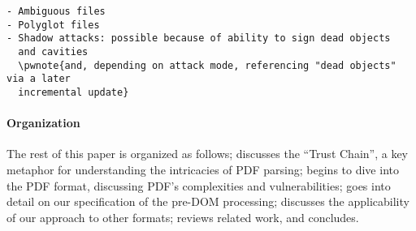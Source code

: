\label{sec:pdf-vulnerabilities}
\begin{lstlisting}[style=meta]
- Ambiguous files
- Polyglot files
- Shadow attacks: possible because of ability to sign dead objects
  and cavities 
  \pwnote{and, depending on attack mode, referencing "dead objects" via a later
  incremental update}
\end{lstlisting}

\paragraph*{Organization} The rest of this paper is organized as
follows;
%
 discusses the ``Trust Chain'', a key metaphor
for understanding the intricacies of PDF parsing;
 begins to dive into the PDF format, discussing PDF's
complexities and vulnerabilities;
 goes into detail on our specification of the pre-DOM processing;
 discusses the applicability of our approach to other formats;
%
 reviews related work, and %
 concludes.

